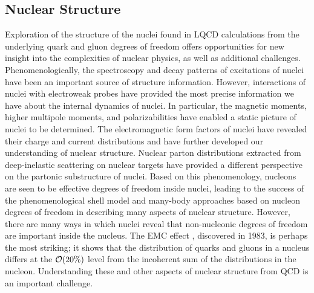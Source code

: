 \subsection{Nuclear Structure}
\label{sec:nuclearstructure}

Exploration of the structure of the nuclei found in LQCD calculations from the underlying quark and gluon degrees of freedom offers  opportunities for new insight into the complexities of nuclear physics, as well as additional challenges.  Phenomenologically, the spectroscopy and decay patterns of excitations of nuclei have been an important source of structure information. However, interactions of nuclei with electroweak probes have provided the most precise information we have about the internal dynamics of nuclei. 
In particular, the magnetic moments,  higher multipole moments, and polarizabilities  have enabled a static picture of nuclei to be determined. The electromagnetic form factors of nuclei have revealed their charge and current distributions and  have further
developed our understanding of nuclear structure. 
Nuclear parton distributions extracted from deep-inelastic scattering on nuclear targets have provided a different perspective on the partonic substructure of nuclei. Based on this phenomenology, nucleons are seen to be effective degrees of freedom inside nuclei, leading to the success of the phenomenological shell model and many-body approaches based on nucleon degrees of freedom in describing many aspects of nuclear structure. However, there are many ways in which nuclei reveal that non-nucleonic degrees of freedom are important inside the nucleus. The EMC effect \cite{Aubert:1983xm}, discovered in 1983, is perhaps the most striking; it shows that the distribution of quarks and gluons in a nucleus differs at the ${\cal O}(20\%)$ level from the incoherent sum of the distributions in the nucleon. Understanding these and other aspects of nuclear structure from QCD  is an important challenge.

